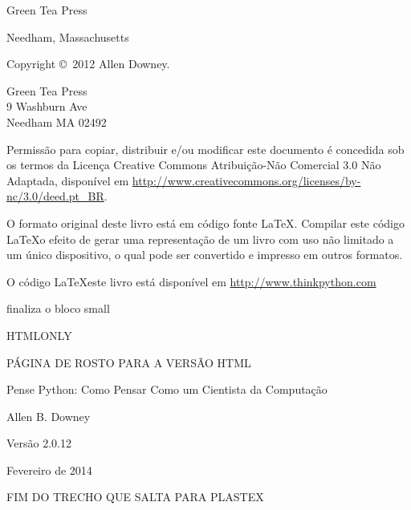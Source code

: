 \documentclass[10pt]{book}
\newcommand{\thetitle}{Pense Python: Como Pensar Como um Cientista da Computação}
\newcommand{\theversion}{2.0.12}
\newcommand{\thedate}{Fevereiro de 2014}
\begin{document}
\begin{latexonly}
\begin{flushright}
{\Large Green Tea Press}

{\small Needham, Massachusetts}

\vfill

\end{flushright}


\pagebreak
\thispagestyle{empty}

{\small
Copyright \copyright ~2012 Allen Downey.


\vspace{0.2in}

\begin{flushleft}
Green Tea Press       \\
9 Washburn Ave        \\
Needham MA 02492
\end{flushleft}

Permissão para copiar, distribuir e/ou modificar este documento é concedida
sob os termos da Licença Creative Commons Atribuição-Não Comercial 3.0 Não Adaptada,
 disponível em \url{http://www.creativecommons.org/licenses/by-nc/3.0/deed.pt_BR}.

O formato original deste livro está em código fonte \LaTeX. Compilar este
código \LaTeX{} o efeito de gerar uma representação de um livro
com uso não limitado a um único dispositivo, o qual pode ser convertido e impresso
em outros formatos.

O código \LaTeX\para este livro está disponível em
\url{http://www.thinkpython.com}

\vspace{0.2in}

} finaliza o bloco small

\end{latexonly}


HTMLONLY

\begin{htmlonly}

PÁGINA DE ROSTO PARA A VERSÃO HTML

{\Large \thetitle}

{\large Allen B. Downey}

Versão \theversion

\thedate

\setcounter{chapter}{-1}

\end{htmlonly}

\fi
FIM DO TRECHO QUE SALTA PARA PLASTEX
\end{document}
